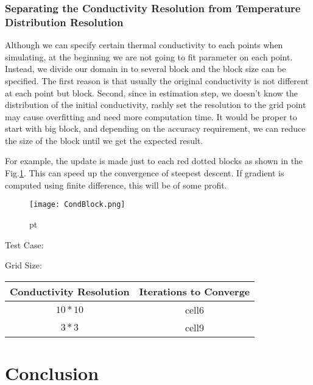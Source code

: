 \documentclass[10pt,a4paper]{report}
\begin{document}
\subsection{Separating the Conductivity Resolution from Temperature Distribution Resolution}
Although we can specify certain thermal conductivity to each points when simulating, at the beginning we are not going to fit parameter on each point. Instead, we divide our domain in to several block and the block size can be specified. The first reason is that usually the original conductivity is not different at each point but block. Second, since in estimation step, we doesn't know the distribution of the initial conductivity, rashly set the resolution to the grid point may cause overfitting and need more computation time. It would be proper to start with big block, and depending on the accuracy requirement, we can reduce the size of the block until we get the expected result.

For example,  the update is made just to each red dotted blocks as shown in the Fig.\ref{fig:CondBlock}. This can speed up the convergence of steepest descent. If gradient is computed using finite difference, this will be of some profit.

\begin{figure}[h]
\begin{center}
\texttt{[image: CondBlock.png]} 
\caption{}  pt
\label{fig:CondBlock}
\end{center}
\end{figure}


Test Case:

Grid Size:\\


\begin{center}
\begin{tabular}{ |c|c| } 
 \hline
 Conductivity Resolution & Iterations to Converge \\ 
 \hline
 $10*10$ & cell6 \\ 
 \hline
 $3*3$   & cell9 \\ 
 \hline
\end{tabular}
\end{center}

\chapter{Conclusion}
\end{document}
